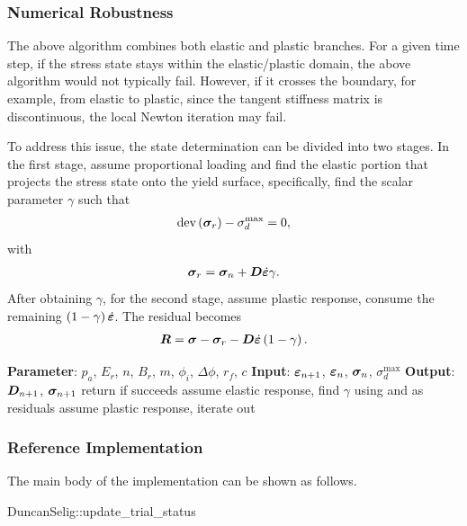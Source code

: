 \subsubsection{Numerical Robustness}
The above algorithm combines both elastic and plastic branches.
For a given time step, if the stress state stays within the elastic/plastic domain, the above algorithm would not typically fail.
However, if it crosses the boundary, for example, from elastic to plastic, since the tangent stiffness matrix is discontinuous, the local Newton iteration may fail.

To address this issue, the state determination can be divided into two stages.
In the first stage, assume proportional loading and find the elastic portion that projects the stress state onto the yield surface, specifically, find the scalar parameter $\gamma$ such that
\begin{gather}\label{eq:ds_1st_stage_a}
\text{dev}\left(\bm{\sigma}_r\right)-\sigma_d^\text{max}=0,
\end{gather}
with
\begin{gather}\label{eq:ds_1st_stage_b}
\bm{\sigma}_r=\bm{\sigma}_n+\bm{D}\dot{\bm{\varepsilon}}\gamma.
\end{gather}
After obtaining $\gamma$, for the second stage, assume plastic response, consume the remaining $\left(1-\gamma\right)\dot{\bm{\varepsilon}}$.
The residual becomes
\begin{gather}\label{eq:ds_two_stage}
\bm{R}=\bm{\sigma}-\bm{\sigma}_r-\bm{D}\dot{\bm{\varepsilon}}\left(1-\gamma\right).
\end{gather}

\begin{breakablealgorithm}
\caption{dual--stage state determination of Duncan soil model}\label{algo:duncan_two_stage}
\begin{algorithmic}
\State \textbf{Parameter}: $p_a$, $E_r$, $n$, $B_r$, $m$, $\phi_i$, $\Delta\phi$, $r_f$, $c$
\State \textbf{Input}: $\bm{\varepsilon}_{n+1}$, $\bm{\varepsilon}_n$, $\bm{\sigma}_n$, $\sigma_d^{\text{max}}$
\State \textbf{Output}: $\bm{D}_{n+1}$, $\bm{\sigma}_{n+1}$
\State return if  succeeds
\State assume elastic response, find $\gamma$ using  and  as residuals
\State assume plastic response, iterate out 
\end{algorithmic}
\end{breakablealgorithm}
\subsubsection{Reference Implementation}
The main body of the implementation can be shown as follows.
\begin{cppcode}
DuncanSelig::update_trial_status
\end{cppcode}

